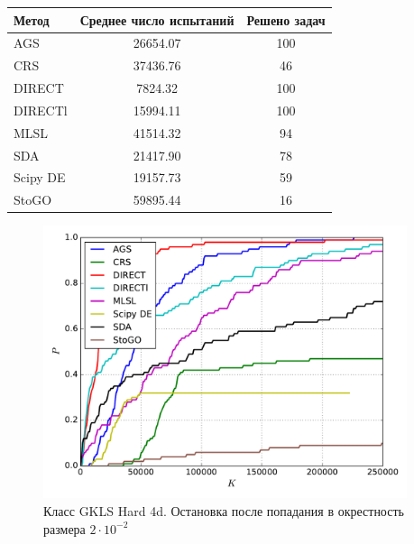 \documentclass[a4paper]{article}
\begin{document}
\begin{tabular}{lcc}
\hline
 Метод    &  Среднее число испытаний  &  Решено задач  \\
\hline
 AGS      &         26654.07          &      100       \\
 CRS      &         37436.76          &       46       \\
 DIRECT   &          7824.32          &      100       \\
 DIRECTl  &         15994.11          &      100       \\
 MLSL     &         41514.32          &       94       \\
 SDA      &         21417.90          &       78       \\
 Scipy DE &         19157.73          &       59       \\
 StoGO    &         59895.44          &       16       \\
\hline
\end{tabular}
\begin{figure}[H]
  \center
  \includegraphics[width=0.95\textwidth]{../experiments/gklsh4d/cmc.pdf}
  \caption{Класс GKLS Hard 4d. Остановка после попадания в окрестность размера $2\cdot10^{-2}$}
  \label{fig:}
\end{figure}
\end{document}
